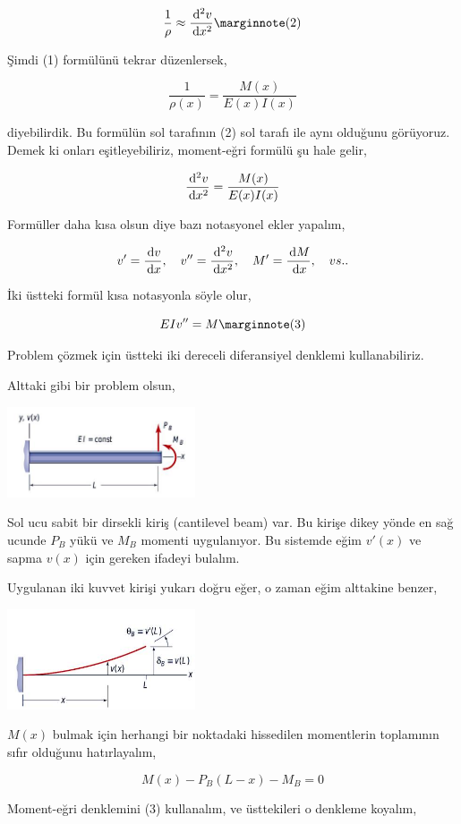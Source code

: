 \documentclass[12pt,fleqn]{article}\usepackage{../../common}
\begin{document}
$$
\frac{1}{\rho} \approx \frac{\ud^2 v}{\ud x^2}
\mlabel{2}
$$

Şimdi (1) formülünü tekrar düzenlersek,

$$
\frac{1}{\rho(x)} = \frac{M(x)}{E(x) I(x)}
$$

diyebilirdik. Bu formülün sol tarafının (2) sol tarafı ile aynı olduğunu
görüyoruz. Demek ki onları eşitleyebiliriz, moment-eğri formülü şu hale gelir,

$$
\frac{\,\mathrm{d}^2 v}{\,\mathrm{d} x^2} = \frac{M(x)}{E(x) I(x)}
$$

Formüller daha kısa olsun diye bazı notasyonel ekler yapalım,

$$
v' = \frac{\,\mathrm{d} v}{\,\mathrm{d} x}, \quad 
v'' = \frac{\,\mathrm{d}^2 v}{\,\mathrm{d} x^2}, \quad 
M' = \frac{\,\mathrm{d} M}{\,\mathrm{d} x}, \quad vs..
$$

İki üstteki formül kısa notasyonla söyle olur,

$$
EI v'' = M
\mlabel{3}
$$

Problem çözmek için üstteki iki dereceli diferansiyel denklemi kullanabiliriz.

Alttaki gibi bir problem olsun,

\includegraphics[width=15em]{phy_020_strs_05_03.jpg}

Sol ucu sabit bir dirsekli kiriş (cantilevel beam) var. Bu kirişe dikey yönde en
sağ ucunde $P_B$ yükü ve $M_B$ momenti uygulanıyor. Bu sistemde eğim $v'(x)$ ve
sapma $v(x)$ için gereken ifadeyi bulalım.

Uygulanan iki kuvvet kirişi yukarı doğru eğer, o zaman eğim alttakine benzer,

\includegraphics[width=15em]{phy_020_strs_05_04.jpg}

$M(x)$ bulmak için herhangi bir noktadaki hissedilen momentlerin toplamının
sıfır olduğunu hatırlayalım,

$$
M(x) - P_B(L-x) - M_B = 0
$$

Moment-eğri denklemini (3) kullanalım, ve üsttekileri o denkleme koyalım,
\end{document}
